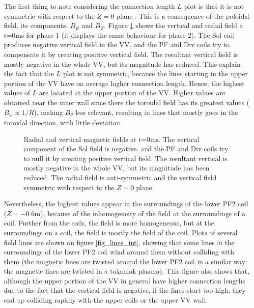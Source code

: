 \documentclass[a4paper,12pt,oneside]{book}
\begin{document}
The first thing to note considering the connection length $L$ plot is that it is not symmetric with respect to the $Z=0$ plane . This is a consequence of the poloidal field, its components, $B_R$ and $B_Z$. Figure \ref{fig_BR_BZ_int} shows the vertical and radial field a t=0ms for phase 1 (it displays the same behaviour for phase 2). The Sol coil produces negative vertical field in the VV, and the PF and Div coils try to compensate it by creating positive vertical field. The resultant vertical field is mostly negative in the whole VV, but its magnitude has reduced. This explain the fact that the $L$ plot is not symmetric, because the lines starting in the upper portion of the VV have on average higher connection length. Hence, the highest values of $L$ are located at the upper portion of the VV. Higher values are obtained near the inner wall since there the toroidal field has its greatest values ($B_\varphi \propto 1/R$), making $B_\theta$ less relevant, resulting in lines that mostly goes in the toroidal direction, with little deviation.

\begin{figure}[htbp]
\centering
{}
\hfill
{}

\caption{Radial and vertical magnetic fields at t=0ms. The vertical component of the Sol field is negative, and the PF and Div coils try to null it by creating positive vertical field. The resultant vertical is mostly negative in the whole VV, but its magnitude has been reduced. The radial field is anti-symmetric and the vertical field symmetric with respect to the $Z=0$ plane.}
\label{fig_BR_BZ_int}
\end{figure}

Nevertheless, the highest values appear in the surroundings of the lower PF2 coil ($Z=-0.6$m), because of the inhomogeneity of the field at the surroundings of a coil. Further from the coils, the field is more homogeneous, but at the surroundings on a coil, the field is mostly the field of the coil. Plots of several field lines are shown on figure \ref{fig_lines_int}, showing that some lines in the surroundings of the lower PF2 coil wind around them without colliding with them (the magnetic lines are twisted around the lower PF2 coil in a similar way the magnetic lines are twisted in a tokamak plasma). This figure also shows that, although the upper portion of the VV in general have higher connection lengths due to the fact that the vertical field is negative, if the lines start too high, they end up colliding rapidly with the upper coils or the upper VV wall.
\end{document}
